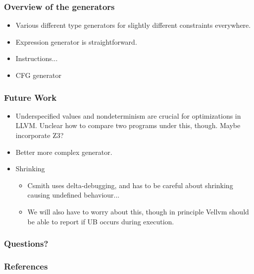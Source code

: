 \documentclass{beamer}
\begin{document}
\begin{frame}
  \frametitle{Overview of the generators}

  \begin{itemize}
  \item Various different type generators for slightly different
    constraints everywhere.
  \item Expression generator is straightforward.
  \item Instructions...
  \item CFG generator
  \end{itemize}

\end{frame}

\begin{frame}
  \frametitle{Future Work}

  \begin{itemize}
  \item Underspecified values and nondeterminism are crucial for
    optimizations in LLVM. Unclear how to compare two programs under
    this, though. Maybe incorporate Z3?
  \item Better more complex generator.
  \item Shrinking
    \begin{itemize}
    \item Csmith uses delta-debugging, and has to be careful about
      shrinking causing undefined behaviour...
    \item We will also have to worry about this, though in principle
      Vellvm should be able to report if UB occurs during execution.
    \end{itemize}
  \end{itemize}
\end{frame}

\begin{frame}
  \frametitle{Questions?}

\end{frame}

\begin{frame}
  \frametitle{References}

  \nocite{*}
  \printbibliography
\end{frame}
\end{document}
